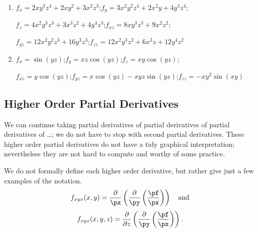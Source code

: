 {\begin{enumerate}
	\item $f_x = 2xy^3z^4+2xy^2+3x^2z^3$;\quad $f_y = 3x^2y^2z^4+2x^2y+4y^3z^4$;
	
	$f_z = 4x^2y^3z^3+3x^3z^2+4y^4z^3$;\quad $f_{xz} = 8xy^3z^3+9x^2z^2$;
	
	$f_{yz} = 12x^2y^2z^3+16y^3z^3$;\quad $f_{zz} = 12x^2y^3z^2+6x^3z+12y^4z^2$
	
	\item	$f_x = \sin(yz)$;\quad $f_y = xz\cos(yz)$;\quad $f_z = xy\cos(yz)$;
	
	$f_{xz} = y\cos(yz)$;\quad $f_{yz} = x\cos(yz) - xyz\sin(yz)$;\quad $f_{zz} = -xy^2\sin(xy)$
	\end{enumerate}}

\subsection*{Higher Order Partial Derivatives}

We can continue taking partial derivatives of partial derivatives of partial derivatives of \ldots; we do not have to stop with second partial derivatives. These higher order partial derivatives do not have a tidy graphical interpretation; nevertheless they are not hard to compute and worthy of some practice. 

We do not formally define each higher order derivative, but rather give just a few examples of the notation.\\
$$f_{xyx}(x,y)  =\frac{\partial}{\px}\left(\frac{\partial}{\py}\left(\frac{\pf}{\px}\right)\right) \quad \text{and}$$
$$f_{xyz}(x,y,z)  =\frac{\partial}{\partial z}\left(\frac{\partial}{\py}\left(\frac{\pf}{\px}\right)\right)  .$$

